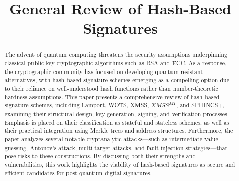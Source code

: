 \documentclass [version=submission]{iacrcc}
\title[running  = {General Review of Hash-Based Signatures},
       subtitle = {}
      ]{General Review of Hash-Based Signatures}
\begin{document}
\maketitle



\begin{abstract}
  The advent of quantum computing threatens the security assumptions underpinning classical public-key cryptographic algorithms such as RSA and ECC. As a response, the cryptographic community has focused on developing quantum-resistant alternatives, with hash-based signature schemes emerging as a compelling option due to their reliance on well-understood hash functions rather than number-theoretic hardness assumptions. This paper presents a comprehensive review of hash-based signature schemes, including Lamport, WOTS, XMSS, $XMSS^{MT}$, and SPHINCS+, examining their structural design, key generation, signing, and verification processes. Emphasis is placed on their classification as stateful and stateless schemes, as well as their practical integration using Merkle trees and address structures. Furthermore, the paper analyzes several notable cryptanalytic attacks—such as intermediate value guessing, Antonov’s attack, multi-target attacks, and fault injection strategies—that pose risks to these constructions. By discussing both their strengths and vulnerabilities, this work highlights the viability of hash-based signatures as secure and efficient candidates for post-quantum digital signatures.
\end{abstract}
\end{document}
